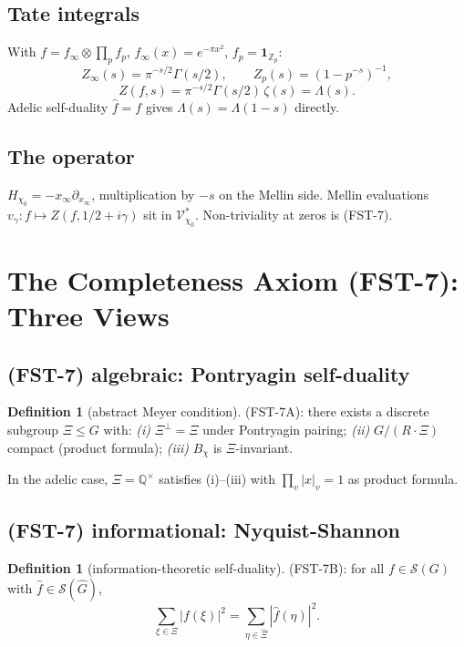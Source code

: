 \documentclass[11pt,a4paper]{article}
\theoremstyle{plain}
\theoremstyle{definition}
\newtheorem{definition}[theorem]{Definition}
\newcommand{\Q}{\mathbb{Q}}
\newcommand{\Z}{\mathbb{Z}}
\newcommand{\V}{\mathcal{V}}
\renewcommand{\S}{\mathcal{S}}
\newcommand{\chifn}{\chi}
\begin{document}
\subsection{Tate integrals}

With $f = f_\infty \otimes \prod_p f_p$, $f_\infty(x) = e^{-\pi x^2}$,
$f_p = \mathbf{1}_{\Z_p}$:
\[
  Z_\infty(s) = \pi^{-s/2} \Gamma(s/2), \qquad
  Z_p(s) = (1 - p^{-s})^{-1},
\]
\[
  Z(f, s) = \pi^{-s/2} \Gamma(s/2) \, \zeta(s) = \Lambda(s).
\]
Adelic self-duality $\hat f = f$ gives
$\Lambda(s) = \Lambda(1-s)$ directly.

\subsection{The operator}

$H_{\chifn_0} = -x_\infty \partial_{x_\infty}$, multiplication by
$-s$ on the Mellin side.  Mellin evaluations $v_\gamma: f \mapsto
Z(f, 1/2+i\gamma)$ sit in $\V_{\chifn_0}^\ast$.  Non-triviality at
zeros is (FST-7).

\section{The Completeness Axiom (FST-7): Three Views}
\label{sec:fst7}

\subsection{(FST-7) algebraic: Pontryagin self-duality}

\begin{definition}[abstract Meyer condition]
\label{def:fst7-a}
(FST-7A): there exists a discrete subgroup $\Xi \leq G$ with:
\textit{(i)} $\Xi^\perp = \Xi$ under Pontryagin pairing;
\textit{(ii)} $G / (R \cdot \Xi)$ compact (product formula);
\textit{(iii)} $B_\chifn$ is $\Xi$-invariant.
\end{definition}

In the adelic case, $\Xi = \Q^\times$ satisfies (i)--(iii) with
$\prod_v |x|_v = 1$ as product formula.

\subsection{(FST-7) informational: Nyquist-Shannon}

\begin{definition}[information-theoretic self-duality]
\label{def:fst7-b}
(FST-7B): for all $f \in \S(G)$ with $\hat f \in \S(\hat G)$,
\[
  \sum_{\xi \in \Xi} |f(\xi)|^2 = \sum_{\eta \in \hat\Xi}
    |\hat f(\eta)|^2.
\]
\end{definition}
\end{document}
